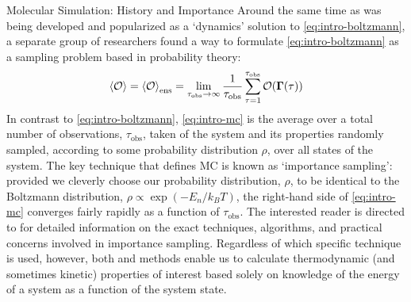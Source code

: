 \begin{section}{Molecular Simulation: History and Importance}
Around the same time as \md was being developed and popularized as a `dynamics' solution to
\cref{eq:intro-boltzmann}, a separate group of
researchers\cite{Metropolis1953} found a way to
formulate \cref{eq:intro-boltzmann} as a sampling problem based in probability
theory: 
\cite{Harrison2010,allen1989computer}
%
\begin{align}
\label{eq:intro-mc}
\braket{\mathcal{O}} = \braket{\mathcal{O}}_{\text{ens}} 
= \lim_{\tau_{\text{obs}} \to \infty} \frac{1}{\tau_{\text{obs}}}
\sum\limits_{\tau = 1}^{\tau_{\text{obs}}}
\mathcal{O}(\bm{\Gamma}(\tau))
\end{align}
%
In contrast to \cref{eq:intro-boltzmann}, \cref{eq:intro-mc} is the average
over a total number of observations, ${\tau_{\text{obs}}}$, taken of the
system and its properties randomly sampled, according to some probability
distribution $\rho$, over all states of the system.  The key technique that
defines MC is known as `importance sampling': provided we cleverly choose our
probability distribution, $\rho$, to be identical to the Boltzmann
distribution, $\rho \propto \exp (-E_n/k_BT)$, the right-hand side of
\cref{eq:intro-mc} converges fairly rapidly as a function of
${\tau_{\text{obs}}}$.  The interested reader is directed to
\citet{allen1989computer} for detailed information
on the exact techniques, algorithms, and practical concerns involved in
importance sampling.  
%
Regardless of which specific technique is used, however, both
\md and \mc methods
enable us to calculate thermodynamic (and sometimes kinetic) properties of
interest based solely on knowledge of the energy of a system as a function of
the system state.





\end{section}
